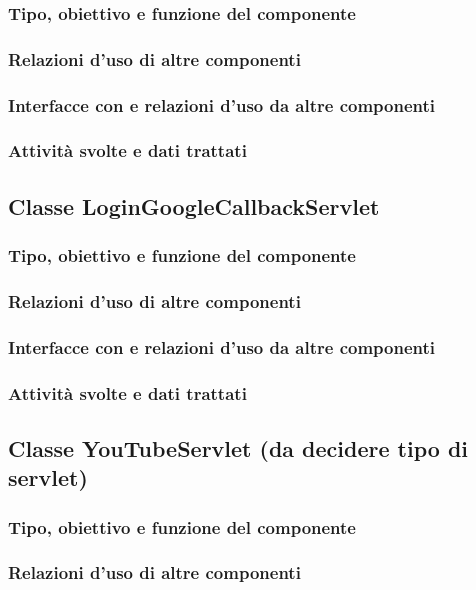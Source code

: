 \subsubsection*{Tipo, obiettivo e funzione del componente}
\subsubsection*{Relazioni d'uso di altre componenti}
\subsubsection*{Interfacce con e relazioni d'uso da altre componenti}
\subsubsection*{Attivit\`a svolte e dati trattati}

\subsection{Classe LoginGoogleCallbackServlet}
\subsubsection*{Tipo, obiettivo e funzione del componente}
\subsubsection*{Relazioni d'uso di altre componenti}
\subsubsection*{Interfacce con e relazioni d'uso da altre componenti}
\subsubsection*{Attivit\`a svolte e dati trattati}

\subsection{Classe YouTubeServlet (da decidere tipo di servlet)}
\subsubsection*{Tipo, obiettivo e funzione del componente}
\subsubsection*{Relazioni d'uso di altre componenti}
